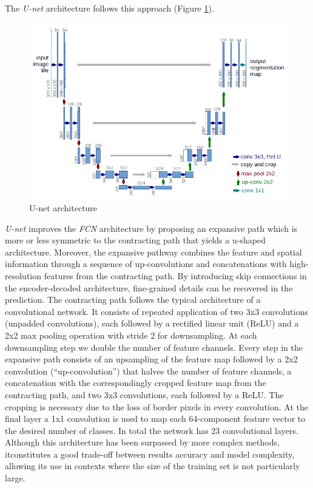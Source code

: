 The \textit{U-net} architecture \citep{ronneberger2015u} follows this approach (Figure \ref{fig:unet_architecture}).
\begin{figure}
\centerline{\includegraphics[scale=0.6]{images/chapter_2/unet.png}}
\caption{U-net architecture \citep{ronneberger2015u}}
\label{fig:unet_architecture}
\end{figure}
\textit{U-net} improves the \textit{FCN} architecture by proposing an expansive path which is more or less symmetric to the contracting path that yields a u-shaped architecture. Moreover, the expansive pathway combines the feature and spatial information through a sequence of up-convolutions and concatenations with high-resolution features from the contracting path. By introducing skip connections in the encoder-decoded architecture, fine-grained details can be recovered in the prediction. The contracting path follows the typical architecture of a convolutional network. It consists of repeated application of two 3x3 convolutions (unpadded convolutions), each followed by a rectified linear unit (ReLU) and a 2x2 max pooling operation with stride 2 for downsampling. At each downsampling step we double the number of feature channels. Every step in the expansive path consists of an upsampling of the feature map followed by a 2x2 convolution (“up-convolution”) that halves the number of feature channels, a concatenation with the correspondingly cropped feature map from the contracting path, and two 3x3 convolutions, each followed by a ReLU. The cropping is necessary due to the loss of border pixels in every convolution. At the final layer a 1x1 convolution is used to map each 64-component feature vector to the desired number of classes. In total the network has 23 convolutional layers.
Although this architecture has been surpassed by more complex methods, itconstitutes a good trade-off between results accuracy and model complexity, allowing its use in contexts where the size of the training set is not particularly large.


